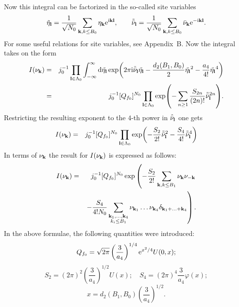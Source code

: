 Now this integral can be factorized in the so-called site variables
\begin{equation*}
	\tilde{\eta}_{\vb l} = \frac{1}{\sqrt{N_0}}\sum_{\vb k, k \leq B_0}\eta_{\vb k}{\rm e}^{{\rm i}{\vb k}{\vb l}}
	, \qquad 
	\tilde{\bar{\nu}}_{\vb l}=\frac{1}{\sqrt{N_0}}\sum_{\vb k, k \leq B_0}\bar{\nu}_{\vb k}{\rm e}^{-{\rm i}{\vb k}{\vb l}}.
\end{equation*}
For some useful relations for site variables, see Appendix~B.
Now the integral takes on the form
\begin{eqnarray*}
	I(\nu_{\vb k}) & = & j_0^{-1} \prod_{\vb l \in \Lambda_0} \int_{-\infty}^{\infty} {\rm d} \tilde{\eta_{\vb l}}
	\exp(2\pi{\rm i} \tilde{\bar{\nu}}_{\vb l} \tilde{\eta_{\vb l}} -\frac{d_2(B_1, B_0)}{2} \tilde{\eta_{\vb l}}^2 - \frac{a_4}{4!}\tilde{\eta_{\vb l}}^4 )
	\\
	& = & j_0^{-1} [Q_{f_0}]^{N_0} \prod_{\vb l \in \Lambda_0} \exp(-\sum_{n \geq 1} \frac{S_{2n}}{(2n)!} \tilde{\bar{\nu}}_{\vb l}^{2n}).
\end{eqnarray*}
Restricting the resulting exponent to the $4$-th power in $\tilde{\bar{\nu}}_{\vb l}$ one gets
\begin{eqnarray*}
	I(\nu_{\vb k}) & = & j_0^{-1} [Q_{f_0}]^{N_0} \prod_{\vb l \in \Lambda_0}
	\exp(-\frac{S_2}{2!}\tilde{\bar{\nu}}_{\vb l}^2 - \frac{S_4}{4!}\tilde{\bar{\nu}}_{\vb l}^4 )
\end{eqnarray*}
In terms of $\nu_{\vb k}$ the result for $I(\nu_{\vb k})$ is expressed as follows:
\begin{eqnarray*}
	I(\nu_{\vb k}) & = & j_0^{-1} [Q_{f_0}]^{N_0} 
	\exp \left(- \frac{S_2}{2!} \sum_{\vb k, k \leq B_1} \nu_{\vb k} \nu_{-\vb k}
	\right.
	\\
	& & \left.
	 - \frac{S_4}{4! N_0} \sum_{\substack{\vb k_1, \dotsc, \vb k_4 \\ k_i \leq B_1}} \nu_{\vb k_1} \dotsc \nu_{\vb k_4} \delta_{\vb{k}_1 + \dotsc + \vb{k}_4}
	 \right)
	 .
\end{eqnarray*}
In the above formulae, the following quantities were introduced:
\begin{equation*}
	Q_{f_0} = \sqrt{2\pi}\left(\frac{3}{a_4}\right)^{1/4} {\rm e}^{x^2/4} U(0,x);
\end{equation*}
\begin{equation*}
	S_2 = (2\pi)^2 \left(\frac{3}{a_4}\right)^{1/2} U(x); \quad S_4 = (2\pi)^4 \frac{3}{a_4}\varphi(x);
\end{equation*}
\begin{equation*}
	x = d_2(B_1, B_0) \left(\frac{3}{a_4}\right)^{1/2}.
\end{equation*}

